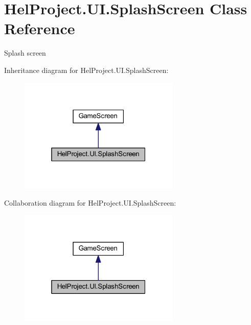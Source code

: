 \hypertarget{class_hel_project_1_1_u_i_1_1_splash_screen}{}\section{Hel\+Project.\+U\+I.\+Splash\+Screen Class Reference}
\label{class_hel_project_1_1_u_i_1_1_splash_screen}


Splash screen  




Inheritance diagram for Hel\+Project.\+U\+I.\+Splash\+Screen\+:\nopagebreak
\begin{figure}[H]
\begin{center}
\leavevmode
\includegraphics[width=217pt]{class_hel_project_1_1_u_i_1_1_splash_screen__inherit__graph}
\end{center}
\end{figure}


Collaboration diagram for Hel\+Project.\+U\+I.\+Splash\+Screen\+:\nopagebreak
\begin{figure}[H]
\begin{center}
\leavevmode
\includegraphics[width=217pt]{class_hel_project_1_1_u_i_1_1_splash_screen__coll__graph}
\end{center}
\end{figure}
